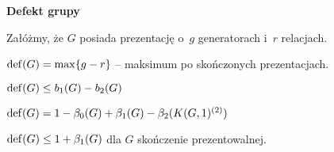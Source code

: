 {\bf Defekt grupy}

Załóżmy, że $G$ posiada prezentację o~$g$ generatorach i~$r$ relacjach.

\begin{definicja}
	${\mathrm{def}}(G) = \max \{ g - r \}$ -- maksimum po skończonych
	prezentacjach.
\end{definicja}

\begin{fakt}
	${\mathrm{def}}(G) \leq b_1(G) - b_2(G)$
	
	${\mathrm{def}}(G) = 1 - \beta_0(G) + \beta_1(G) - \beta_2(K(G, 1)^{(2)})$
\end{fakt}

\begin{wniosek}
	${\mathrm{def}}(G) \leq 1 + \beta_1(G)$ dla $G$ skończenie prezentowalnej.
\end{wniosek}















